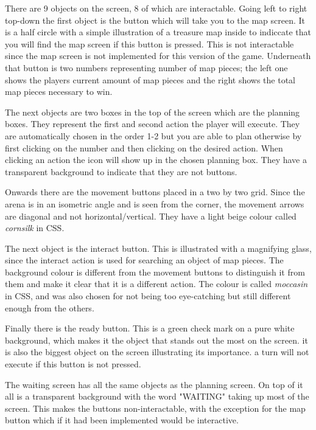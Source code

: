 There are 9 objects on the screen, 8 of which are interactable.
Going left to right top-down the first object is the button which will take you to the map screen. It is a half circle with a simple illustration of a treasure map inside to indiccate that you will find the map screen if this button is pressed. This is not interactable since the map screen is not implemented for this version of the game. Underneath that button is two numbers representing number of map pieces; the left one shows the players current amount of map pieces and the right shows the total map pieces necessary to win.

The next objects are two boxes in the top of the screen which are the planning boxes. They represent the first and second action the player will execute. They are automatically chosen in the order 1-2 but you are able to plan otherwise by first clicking on the number and then clicking on the desired action. When clicking an action the icon will show up in the chosen planning box. They have a transparent background to indicate that they are not buttons. 

Onwards there are the movement buttons placed in a two by two grid. Since the arena is in an isometric angle and is seen from the corner, the movement arrows are diagonal and not horizontal/vertical. They have a light beige colour called \textit{cornsilk} in CSS. 

The next object is the interact button. This is illustrated with a magnifying glass, since the interact action is used for searching an object of map pieces. The background colour is different from the movement buttons to distinguish it from them and make it clear that it is a different action. The colour is called \textit{moccasin} in CSS, and was also chosen for not being too eye-catching but still different enough from the others. 

Finally there is the ready button. This is a green check mark on a pure white background, which makes it the object that stands out the most on the screen. it is also the biggest object on the screen illustrating its importance. a turn will not execute if this button is not pressed. 

The waiting screen has all the same objects as the planning screen. On top of it all is a transparent background with the word "WAITING" taking up most of the screen. This makes the buttons non-interactable, with the exception for the map button which if it had been implemented would be interactive.  
